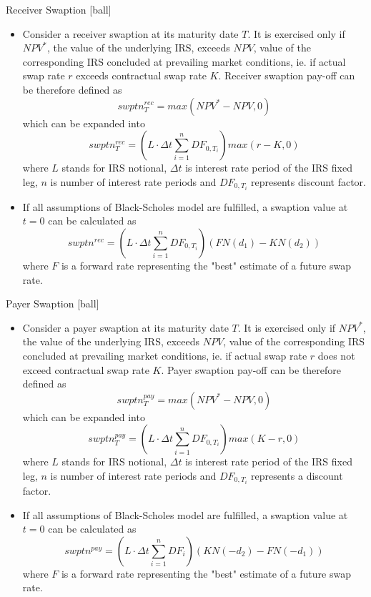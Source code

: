 \documentclass{beamer}
\begin{document}
\begin{frame}{Receiver Swaption}
[ball]
\begin{itemize}
\item Consider a receiver swaption at its maturity date $T$. It is exercised only if $NPV^*$, the value of the underlying IRS, exceeds $NPV$, value of the corresponding IRS concluded at prevailing market conditions, ie. if actual swap rate $r$ exceeds contractual swap rate $K$. Receiver swaption pay-off can be therefore defined as
\begin{equation}
swptn^{rec}_T = max(NPV^* - NPV, 0)
\end{equation}
which can be expanded into
\begin{equation}
swptn^{rec}_T = (L \cdot \Delta t \sum_{i = 1}^n DF_{0, T_i})max(r - K, 0)
\end{equation}
where $L$ stands for IRS notional, $\Delta t$ is interest rate period of the IRS fixed leg, $n$ is number of interest rate periods and $DF_{0, T_i}$ represents discount factor.
\item If all assumptions of Black-Scholes model are fulfilled, a swaption value at $t = 0$ can be calculated as
\begin{equation}
swptn^{rec} = (L \cdot \Delta t \sum_{i = 1}^n DF_{0, T_i}) \left(FN(d_1) - KN(d_2)\right)
\end{equation}
where $F$ is a forward rate representing the "best" estimate of a future swap rate.
\end{itemize}
\end{frame}

\begin{frame}{Payer Swaption}
[ball]
\begin{itemize}
\item Consider a payer swaption at its maturity date $T$. It is exercised only if $NPV^*$, the value of the underlying IRS, exceeds $NPV$, value of the corresponding IRS concluded at prevailing market conditions, ie. if actual swap rate $r$ does not exceed contractual swap rate $K$. Payer swaption pay-off can be therefore defined as
\begin{equation}
swptn^{pay}_T = max(NPV^* - NPV, 0)
\end{equation}
which can be expanded into
\begin{equation}
swptn^{pay}_T = (L \cdot \Delta t \sum_{i = 1}^n DF_{0, T_i})max(K - r, 0)
\end{equation}
where $L$ stands for IRS notional, $\Delta t$ is interest rate period of the IRS fixed leg, $n$ is number of interest rate periods and $DF_{0, T_i}$ represents a discount factor.
\item If all assumptions of Black-Scholes model are fulfilled, a swaption value at $t = 0$ can be calculated as
\begin{equation}
swptn^{pay} = (L \cdot \Delta t \sum_{i = 1}^n DF_i) \left(KN(-d_2) - FN(-d_1) \right)
\end{equation}
where $F$ is a forward rate representing the "best" estimate of a future swap rate.
\end{itemize}
\end{frame}
\end{document}
